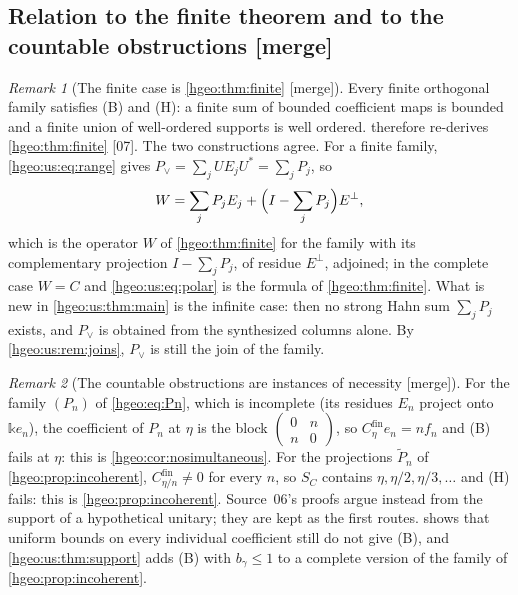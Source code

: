 \documentclass[11pt,letterpaper]{article}
\numberwithin{equation}{section}
\theoremstyle{definition}
\theoremstyle{remark}
\newtheorem{remark}[remark]{Remark}
\newcommand{\kk}{\mathbb k}
\newcommand{\src}[1]{\textup{\textsf{\small[#1]}}}
\newcommand{\mergetag}{\textup{\textsf{\small[merge]}}}
\newcommand{\fin}{\mathrm{fin}}
\begin{document}
\subsection{Relation to the finite theorem and to the countable obstructions
\mergetag}\label{hgeo:us:sub:relation}

\begin{remark}[The finite case is \cref{hgeo:thm:finite} \mergetag]
\label{hgeo:us:rem:finite}
Every finite orthogonal family satisfies (B) and (H): a finite sum of bounded
coefficient maps is bounded and a finite union of well-ordered supports is
well ordered.  therefore re-derives
\cref{hgeo:thm:finite} \src{07}. The two constructions agree. For a finite
family, \eqref{hgeo:us:eq:range} gives
$P_\vee=\sum_jUE_jU^*=\sum_jP_j$, so
\[
 W=\sum_jP_jE_j+\Bigl(I-\sum_jP_j\Bigr)E^\perp ,
\]
which is the operator $W$ of \cref{hgeo:thm:finite} for the family with its
complementary projection $I-\sum_jP_j$, of residue $E^\perp$, adjoined; in
the complete case $W=C$ and \eqref{hgeo:us:eq:polar} is the formula of
\cref{hgeo:thm:finite}. What is new in \cref{hgeo:us:thm:main} is the infinite
case: then no strong Hahn sum $\sum_jP_j$ exists, and $P_\vee$ is obtained
from the synthesized columns alone. By \cref{hgeo:us:rem:joins}, $P_\vee$ is
still the join of the family.
\end{remark}

\begin{remark}[The countable obstructions are instances of necessity
\mergetag]\label{hgeo:us:rem:instances}
For the family $(P_n)$ of \eqref{hgeo:eq:Pn}, which is incomplete (its
residues $E_n$ project onto $\kk e_n$), the coefficient of $P_n$ at $\eta$ is
the block $\left(\begin{smallmatrix}0&n\\n&0\end{smallmatrix}\right)$, so
$C_\eta^\fin e_n=nf_n$ and (B) fails at $\eta$: this is
\cref{hgeo:cor:nosimultaneous}. For the projections $\widetilde P_n$ of
\cref{hgeo:prop:incoherent}, $C^\fin_{\eta/n}\ne0$ for every $n$, so $S_C$
contains $\eta,\eta/2,\eta/3,\ldots$ and (H) fails: this is
\cref{hgeo:prop:incoherent}. Source~06's proofs argue instead from the
support of a hypothetical unitary; they are kept as the first routes.
 shows that uniform bounds on every individual
coefficient still do not give (B), and \cref{hgeo:us:thm:support} adds
(B) with $b_\gamma\le1$ to a complete version of the family of
\cref{hgeo:prop:incoherent}.
\end{remark}
\end{document}
